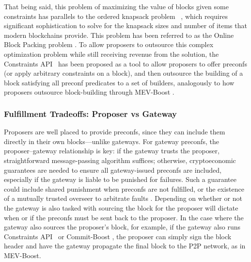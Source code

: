 \documentclass[a4paper]{article}
\theoremstyle{boldstyle}
\begin{document}
That being said, this problem of maximizing the value of blocks given some constraints has parallels to the ordered knapsack problem ~\cite{P:Partiallyorderedknapsackandapplicationstoscheculing}, which requires significant sophistication to solve for the knapsack sizes and number of items that modern blockchains provide. This problem has been referred to as the Online Block Packing problem \cite{OnlineBlockPacking}. To allow proposers to outsource this complex optimization problem while still receiving revenue from the solution, the Constraints API~\cite{W:ConstraintsAPISpecification} has been proposed as a tool to allow proposers to offer preconfs (or apply arbitrary constraints on a block), and then outsource the building of a block satisfying all preconf predicates to a set of builders, analogously to how proposers outsource block-building through MEV-Boost \cite{MEV-Boost}. 

\subsubsection{Fulfillment Tradeoffs: Proposer vs Gateway}
\label{delivery_tradeoffs}

Proposers are well placed to provide preconfs, since they can include them directly in their own blocks—unlike gateways.  For gateway preconfs, the proposer–gateway relationship is key: if the gateway trusts the proposer, straightforward message-passing algorithm  suffices; otherwise, cryptoeconomic guarantees are needed to ensure all gateway-issued preconfs are included, especially if the gateway is liable to be punished for failures. Such a guarantee could include shared punishment when preconfs are not fulfilled, or the existence of a mutually trusted overseer to arbitrate faults \cite{W:PreconfirmationFairExchange,W:FaultAttribution}. 
Depending on whether or not the gateway is also tasked with sourcing the block for the proposer will dictate when or if the preconfs must be sent back to the proposer. In the case where the gateway also sources the proposer's block, for example, if the gateway also runs Constraints API~\cite{W:ConstraintsAPISpecification} or Commit-Boost \cite{CommitBoostRepo}, the proposer can simply sign the block header and have the gateway propagate the final block to the P2P network, as in MEV-Boost.
\end{document}
